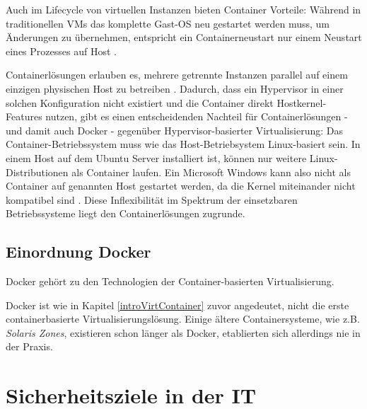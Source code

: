 \documentclass[../main.tex]{subfiles}
\begin{document}
      Auch im Lifecycle von virtuellen Instanzen bieten Container Vorteile: Während in traditionellen VMs das komplette Gast-OS neu gestartet werden muss, um Änderungen zu übernehmen, entspricht ein Containerneustart nur einem Neustart eines Prozesses auf Host \cite[S.2]{dockerLXCKub}.



      Containerlösungen erlauben es, mehrere getrennte Instanzen parallel auf einem einzigen physischen Host zu betreiben \cite[S.6]{dockerBook}. Dadurch, dass ein Hypervisor in einer solchen Konfiguration nicht existiert und die Container direkt Hostkernel-Features nutzen, gibt es einen entscheidenden Nachteil für Containerlösungen - und damit auch Docker - gegenüber Hypervisor-basierter Virtualisierung: Das Container-Betriebssystem muss wie das Host-Betriebsystem Linux-basiert sein. In einem Host auf dem Ubuntu Server installiert ist, können nur weitere Linux-Distributionen als Container laufen. Ein Microsoft Windows kann also nicht als Container auf genannten Host gestartet werden, da die Kernel miteinander nicht kompatibel sind \cite[S.6]{dockerBook}. Diese Inflexibilität im Spektrum der einsetzbaren Betriebssysteme liegt den Containerlösungen zugrunde.




	  \subsection{Einordnung Docker}
      Docker gehört zu den Technologien der Container-basierten Virtualisierung.


      Docker ist wie in Kapitel \ref{introVirtContainer} zuvor angedeutet, nicht die erste containerbasierte Virtualisierungslösung. Einige ältere Containersysteme, wie z.B. \emph{Solaris Zones}, existieren schon länger als Docker, etablierten sich allerdings nie in der Praxis.
  \section{Sicherheitsziele in der IT}
  \label{introSecGoals}
\end{document}

